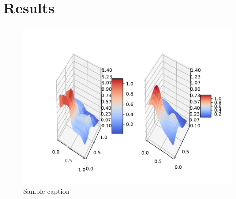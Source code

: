 \section{Results}
\begin{figure}[h]
\hspace{-2.8cm}
\includegraphics[width = \paperwidth]{figures/comparison.pdf}
\caption{Sample caption}
\label{fig:sample-label}
\end{figure}
